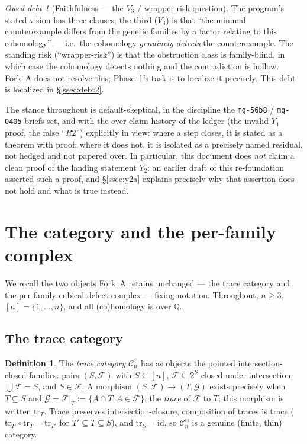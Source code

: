 \documentclass[11pt,oneside]{amsart}
\theoremstyle{plain}
\theoremstyle{definition}
\newtheorem{definition}[theorem]{Definition}
\theoremstyle{remark}
\theoremstyle{honeststyle}
\newtheorem{debt}[theorem]{Owed debt}
\newcommand{\F}{\mathcal{F}}
\newcommand{\G}{\mathcal{G}}
\newcommand{\Q}{\mathbb{Q}}
\newcommand{\Cn}{\mathcal{C}^{\cap}_n}
\newcommand{\tr}{\mathrm{tr}}
\begin{document}
\begin{debt}[Faithfulness --- the $V_3$ / wrapper-risk question]
\label{debt:faithful}
The program's stated vision has three clauses; the third ($V_3$) is
that ``the minimal counterexample differs from the generic families by
a factor relating to this cohomology'' --- i.e.\ the cohomology
\emph{genuinely detects} the counterexample. The standing risk
(``wrapper-risk'') is that the obstruction class is family-blind, in
which case the cohomology detects nothing and the contradiction is
hollow. Fork~A does not resolve this; Phase~1's task is to localize it
precisely. This debt is localized in \S\ref{ssec:debt2}.
\end{debt}

The stance throughout is default-skeptical, in the discipline the
\texttt{mg-56b8} / \texttt{mg-0405} briefs set, and with the
over-claim history of the ledger (the invalid $Y_1$ proof, the false
``$R2$'') explicitly in view: where a step closes, it is stated as a
theorem with proof; where it does not, it is isolated as a precisely
named residual, not hedged and not papered over. In particular, this
document does \emph{not} claim a clean proof of the landing statement
$Y_2$: an earlier draft of this re-foundation asserted such a proof,
and \S\ref{ssec:y2a} explains precisely why that assertion does not
hold and what is true instead.

\section{The category and the per-family complex}
\label{sec:category}

We recall the two objects Fork~A retains unchanged --- the trace
category and the per-family cubical-defect complex --- fixing notation.
Throughout, $n\ge3$, $[n]=\{1,\dots,n\}$, and all (co)homology is over
$\Q$.

\subsection{The trace category}
\label{ssec:trace-category}

\begin{definition}
\label{def:category}
The \emph{trace category} $\Cn$ has as objects the pointed
intersection-closed families: pairs $(S,\F)$ with $S\subseteq[n]$,
$\F\subseteq2^S$ closed under intersection, $\bigcup\F=S$, and
$S\in\F$. A morphism $(S,\F)\to(T,\G)$ exists precisely when
$T\subseteq S$ and $\G=\F|_T:=\{A\cap T:A\in\F\}$, the \emph{trace} of
$\F$ to $T$; this morphism is written $\tr_T$. Trace preserves
intersection-closure, composition of traces is trace
($\tr_{T'}\circ\tr_T=\tr_{T'}$ for $T'\subseteq T\subseteq S$), and
$\tr_S=\mathrm{id}$, so $\Cn$ is a genuine (finite, thin) category.
\end{definition}
\end{document}
